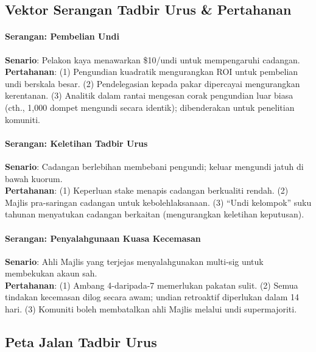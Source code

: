 \documentclass[11pt]{article}
\begin{document}
\subsection{Vektor Serangan Tadbir Urus \& Pertahanan}

\paragraph{Serangan: Pembelian Undi}
\textbf{Senario}: Pelakon kaya menawarkan \$10/undi untuk mempengaruhi cadangan.\\
\textbf{Pertahanan}: (1) Pengundian kuadratik mengurangkan ROI untuk pembelian undi berskala besar. (2) Pendelegasian kepada pakar dipercayai mengurangkan kerentanan. (3) Analitik dalam rantai mengesan corak pengundian luar biasa (cth., 1,000 dompet mengundi secara identik); dibenderakan untuk penelitian komuniti.

\paragraph{Serangan: Keletihan Tadbir Urus}
\textbf{Senario}: Cadangan berlebihan membebani pengundi; keluar mengundi jatuh di bawah kuorum.\\
\textbf{Pertahanan}: (1) Keperluan stake menapis cadangan berkualiti rendah. (2) Majlis pra-saringan cadangan untuk kebolehlaksanaan. (3) ``Undi kelompok'' suku tahunan menyatukan cadangan berkaitan (mengurangkan keletihan keputusan).

\paragraph{Serangan: Penyalahgunaan Kuasa Kecemasan}
\textbf{Senario}: Ahli Majlis yang terjejas menyalahgunakan multi-sig untuk membekukan akaun sah.\\
\textbf{Pertahanan}: (1) Ambang 4-daripada-7 memerlukan pakatan sulit. (2) Semua tindakan kecemasan dilog secara awam; undian retroaktif diperlukan dalam 14 hari. (3) Komuniti boleh membatalkan ahli Majlis melalui undi supermajoriti.

\subsection{Peta Jalan Tadbir Urus}
\end{document}
